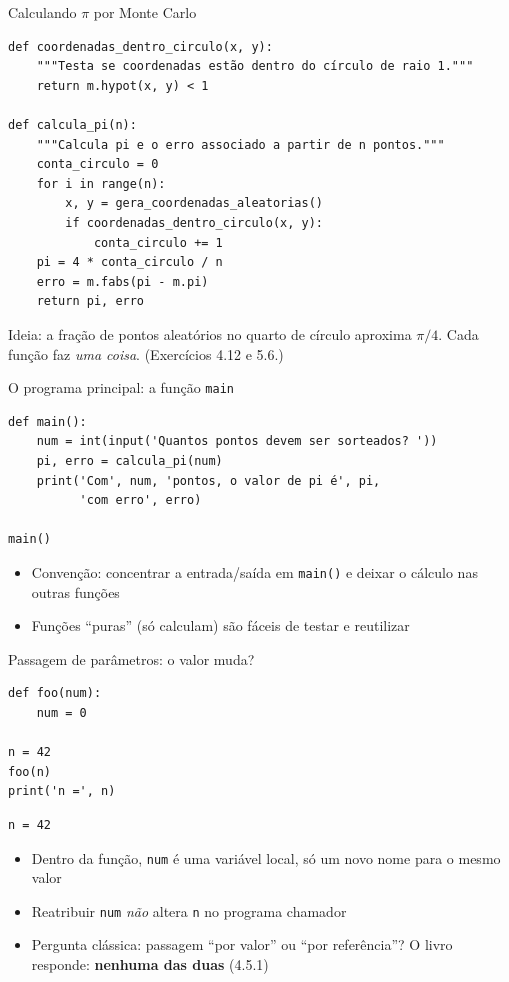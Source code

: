\documentclass[aspectratio=169,10pt,t]{beamer}
\begin{document}
\begin{frame}[fragile]{Calculando \(\pi\) por Monte Carlo}
\begin{lstlisting}[basicstyle=\ttfamily\scriptsize]
def coordenadas_dentro_circulo(x, y):
    """Testa se coordenadas estão dentro do círculo de raio 1."""
    return m.hypot(x, y) < 1

def calcula_pi(n):
    """Calcula pi e o erro associado a partir de n pontos."""
    conta_circulo = 0
    for i in range(n):
        x, y = gera_coordenadas_aleatorias()
        if coordenadas_dentro_circulo(x, y):
            conta_circulo += 1
    pi = 4 * conta_circulo / n
    erro = m.fabs(pi - m.pi)
    return pi, erro
\end{lstlisting}
  \small Ideia: a fração de pontos aleatórios no quarto de círculo aproxima \(\pi/4\). Cada função faz \emph{uma coisa}. (Exercícios 4.12 e 5.6.)\\
\end{frame}

\begin{frame}[fragile]{O programa principal: a função \texttt{main}}
\begin{lstlisting}
def main():
    num = int(input('Quantos pontos devem ser sorteados? '))
    pi, erro = calcula_pi(num)
    print('Com', num, 'pontos, o valor de pi é', pi,
          'com erro', erro)

main()
\end{lstlisting}
  \begin{itemize}
    \item Convenção: concentrar a entrada/saída em \texttt{main()} e deixar o cálculo nas outras funções
    \item Funções ``puras'' (só calculam) são fáceis de testar e reutilizar
  \end{itemize}
\end{frame}

\begin{frame}[fragile]{Passagem de parâmetros: o valor muda?}
\begin{lstlisting}
def foo(num):
    num = 0

n = 42
foo(n)
print('n =', n)
\end{lstlisting}
\begin{lstlisting}[style=saida]
n = 42
\end{lstlisting}
  \begin{itemize}
    \item Dentro da função, \texttt{num} é uma \alert{variável local}, só um novo nome para o mesmo valor
    \item Reatribuir \texttt{num} \emph{não} altera \texttt{n} no programa chamador
    \item Pergunta clássica: passagem ``por valor'' ou ``por referência''? O livro responde: \textbf{nenhuma das duas} (4.5.1)
  \end{itemize}
\end{frame}
\end{document}
